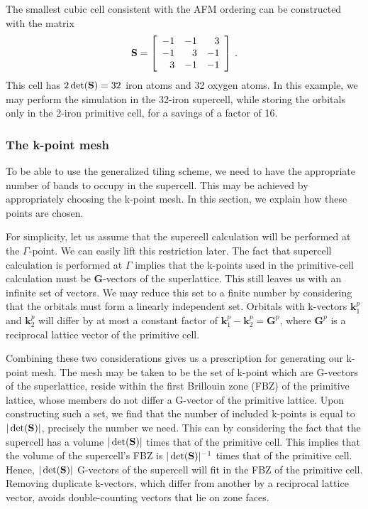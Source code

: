 The smallest cubic cell consistent with the AFM ordering can be
constructed with the matrix
\begin{equation}
\mathbf{S} = \left[\begin{array}{rrr}
  -1 & -1 &  3 \\
  -1 &  3 & -1 \\
   3 & -1 & -1 
  \end{array}\right]\:.
\end{equation}
This cell has $2\det(\mathbf{S}) = 32$ iron atoms and 32 oxygen atoms.  In
this example, we may perform the simulation in the 32-iron supercell,
while storing the orbitals only in the 2-iron primitive cell, for a
savings of a factor of 16.  

\subsubsection{The k-point mesh}
To be able to use the generalized tiling scheme, we need to
have the appropriate number of bands to occupy in the supercell.
This may be achieved by appropriately choosing the k-point mesh.  In
this section, we explain how these points are chosen.  

For simplicity, let us assume that the supercell calculation will be
performed at the $\Gamma$-point.  We can easily lift this restriction later.  The fact that supercell calculation is performed at
$\Gamma$ implies that the k-points used in the primitive-cell
calculation must be $\mathbf{G}$-vectors of the superlattice.  This
still leaves us with an infinite set of vectors.  We may reduce this
set to a finite number by considering that the orbitals must form a
linearly independent set.  Orbitals with k-vectors $\mathbf{k}^p_1$
and $\mathbf{k}^p_2$ will differ by at most a constant factor of
$\mathbf{k}^p_1 - \mathbf{k}^p_2 = \mathbf{G}^p$, where $\mathbf{G}^p$
is a reciprocal lattice vector of the primitive cell.  

Combining these two considerations gives us a prescription for
generating our k-point mesh.  The mesh may be taken to be the set of
k-point which are G-vectors of the superlattice, reside within the
first Brillouin zone (FBZ) of the primitive lattice, whose members do
not differ a G-vector of the primitive lattice.  Upon constructing
such a set, we find that the number of included k-points is equal to
$|\det(\mathbf{S})|$, precisely the number we need.  This can by considering
the fact that the supercell has a volume $|\det(\mathbf{S})|$ times that of
the primitive cell.  This implies that the volume of the supercell's
FBZ is $|\det(\mathbf{S})|^{-1}$ times that of the primitive cell.  Hence,
$|\det(\mathbf{S})|$ G-vectors of the supercell will fit in the FBZ of the
primitive cell.  Removing duplicate k-vectors, which differ from
another by a reciprocal lattice vector, avoids double-counting vectors
that lie on zone faces.

